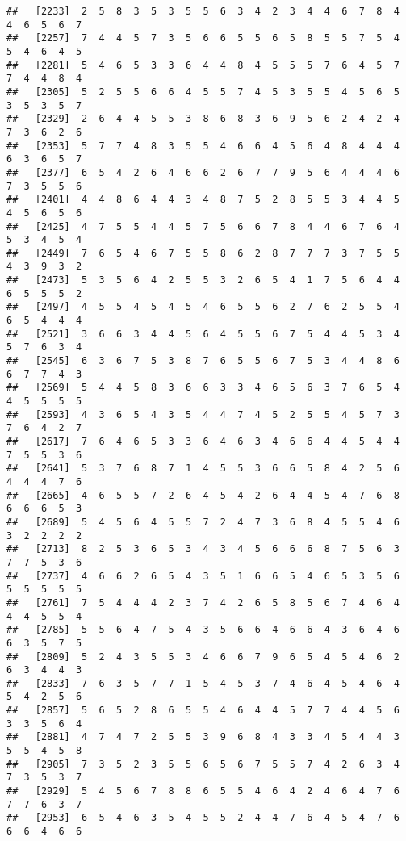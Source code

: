 \documentclass[
]{book}
\begin{document}
\begin{verbatim}
##   [2233]  2  5  8  3  5  3  5  5  6  3  4  2  3  4  4  6  7  8  4  4  6  5  6  7
##   [2257]  7  4  4  5  7  3  5  6  6  5  5  6  5  8  5  5  7  5  4  5  4  6  4  5
##   [2281]  5  4  6  5  3  3  6  4  4  8  4  5  5  5  7  6  4  5  7  7  4  4  8  4
##   [2305]  5  2  5  5  6  6  4  5  5  7  4  5  3  5  5  4  5  6  5  3  5  3  5  7
##   [2329]  2  6  4  4  5  5  3  8  6  8  3  6  9  5  6  2  4  2  4  7  3  6  2  6
##   [2353]  5  7  7  4  8  3  5  5  4  6  6  4  5  6  4  8  4  4  4  6  3  6  5  7
##   [2377]  6  5  4  2  6  4  6  6  2  6  7  7  9  5  6  4  4  4  6  7  3  5  5  6
##   [2401]  4  4  8  6  4  4  3  4  8  7  5  2  8  5  5  3  4  4  5  4  5  6  5  6
##   [2425]  4  7  5  5  4  4  5  7  5  6  6  7  8  4  4  6  7  6  4  5  3  4  5  4
##   [2449]  7  6  5  4  6  7  5  5  8  6  2  8  7  7  7  3  7  5  5  4  3  9  3  2
##   [2473]  5  3  5  6  4  2  5  5  3  2  6  5  4  1  7  5  6  4  4  6  5  5  5  2
##   [2497]  4  5  5  4  5  4  5  4  6  5  5  6  2  7  6  2  5  5  4  6  5  4  4  4
##   [2521]  3  6  6  3  4  4  5  6  4  5  5  6  7  5  4  4  5  3  4  5  7  6  3  4
##   [2545]  6  3  6  7  5  3  8  7  6  5  5  6  7  5  3  4  4  8  6  6  7  7  4  3
##   [2569]  5  4  4  5  8  3  6  6  3  3  4  6  5  6  3  7  6  5  4  4  5  5  5  5
##   [2593]  4  3  6  5  4  3  5  4  4  7  4  5  2  5  5  4  5  7  3  7  6  4  2  7
##   [2617]  7  6  4  6  5  3  3  6  4  6  3  4  6  6  4  4  5  4  4  7  5  5  3  6
##   [2641]  5  3  7  6  8  7  1  4  5  5  3  6  6  5  8  4  2  5  6  4  4  4  7  6
##   [2665]  4  6  5  5  7  2  6  4  5  4  2  6  4  4  5  4  7  6  8  6  6  6  5  3
##   [2689]  5  4  5  6  4  5  5  7  2  4  7  3  6  8  4  5  5  4  6  3  2  2  2  2
##   [2713]  8  2  5  3  6  5  3  4  3  4  5  6  6  6  8  7  5  6  3  7  7  5  3  6
##   [2737]  4  6  6  2  6  5  4  3  5  1  6  6  5  4  6  5  3  5  6  5  5  5  5  5
##   [2761]  7  5  4  4  4  2  3  7  4  2  6  5  8  5  6  7  4  6  4  4  4  5  5  4
##   [2785]  5  5  6  4  7  5  4  3  5  6  6  4  6  6  4  3  6  4  6  6  3  5  7  5
##   [2809]  5  2  4  3  5  5  3  4  6  6  7  9  6  5  4  5  4  6  2  6  3  4  4  3
##   [2833]  7  6  3  5  7  7  1  5  4  5  3  7  4  6  4  5  4  6  4  5  4  2  5  6
##   [2857]  5  6  5  2  8  6  5  5  4  6  4  4  5  7  7  4  4  5  6  3  3  5  6  4
##   [2881]  4  7  4  7  2  5  5  3  9  6  8  4  3  3  4  5  4  4  3  5  5  4  5  8
##   [2905]  7  3  5  2  3  5  5  6  5  6  7  5  5  7  4  2  6  3  4  7  3  5  3  7
##   [2929]  5  4  5  6  7  8  8  6  5  5  4  6  4  2  4  6  4  7  6  7  7  6  3  7
##   [2953]  6  5  4  6  3  5  4  5  5  2  4  4  7  6  4  5  4  7  6  6  6  4  6  6

\end{verbatim}
\end{document}
